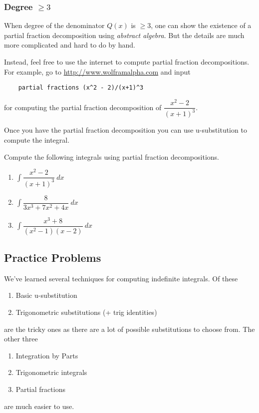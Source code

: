 \subsubsection*{Degree $\ge 3$}
When degree of the denominator $Q(x)$ is $\ge 3$, one can show the existence of a partial fraction decomposition using {\it abstract algebra}.
But the details are much more complicated and hard to do by hand.

Instead, feel free to use the internet to compute partial fraction decompositions. For example, go to \url{http://www.wolframalpha.com} and input
\begin{verbatim}
	partial fractions (x^2 - 2)/(x+1)^3
\end{verbatim}
for computing the partial fraction decomposition of $\dfrac{x^2 - 2}{(x+1)^3}$.

Once you have the partial fraction decomposition you can use u-substitution to compute the integral.

\begin{exercise}
	Compute the following integrals using partial fraction decompositions.
	\begin{multicols}{2}
		\begin{enumerate}
			\item $ \int \dfrac{x^2 - 2}{(x+1)^3} \: dx$
			\item $ \int \dfrac{8}{3x^3 + 7x^2 + 4x} \: dx$
			\item $ \int \dfrac{x^3 + 8}{(x^2 - 1)(x - 2)} \: dx$
		\end{enumerate}
	\end{multicols}
\end{exercise}











\newpage
\subsection{Practice Problems}
We've learned several techniques for computing indefinite integrals. Of these
\begin{enumerate}
	\item Basic u-substitution
	\item Trigonometric substitutions (+ trig identities)
\end{enumerate}
are the tricky ones as there are a lot of possible substitutions to choose from. The other three
\begin{enumerate}[resume]
	\item Integration by Parts
	\item Trigonometric integrals
	\item Partial fractions
\end{enumerate}
are much easier to use.\\

